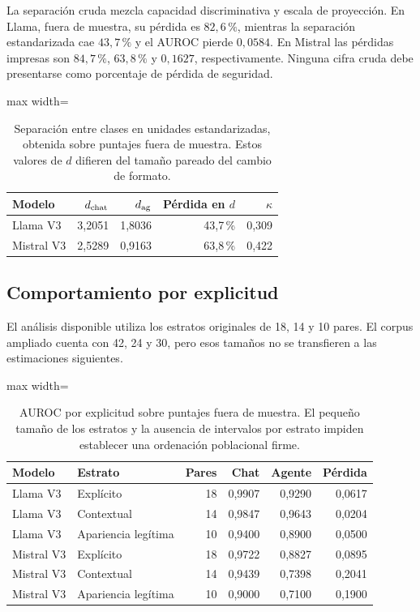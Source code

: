 La separación cruda mezcla capacidad discriminativa y escala de proyección. En Llama, fuera de muestra, su pérdida es $82{,}6\,\%$, mientras la separación estandarizada cae $43{,}7\,\%$ y el AUROC pierde $0{,}0584$. En Mistral las pérdidas impresas son $84{,}7\,\%$, $63{,}8\,\%$ y $0{,}1627$, respectivamente. Ninguna cifra cruda debe presentarse como porcentaje de pérdida de seguridad.
\begin{table}[htbp]\centering\small
\begin{adjustbox}{max width=\textwidth}
\begin{tabular}{@{}lrrrr@{}}\toprule
Modelo & $d_{\rm chat}$ & $d_{\rm ag}$ & Pérdida en $d$ & $\kappa$ \\\midrule
Llama V3 & 3{,}2051 & 1{,}8036 & 43{,}7\,\% & 0{,}309 \\
Mistral V3 & 2{,}5289 & 0{,}9163 & 63{,}8\,\% & 0{,}422 \\
\bottomrule\end{tabular}\end{adjustbox}
\caption{Separación entre clases en unidades estandarizadas, obtenida sobre puntajes fuera de muestra. Estos valores de $d$ difieren del tamaño pareado del cambio de formato.}\label{tab:escala}\end{table}

\subsection{Comportamiento por explicitud}
\label{sec:estratos}

El análisis disponible utiliza los estratos originales de 18, 14 y 10 pares. El corpus ampliado cuenta con 42, 24 y 30, pero esos tamaños no se transfieren a las estimaciones siguientes.
\begin{table}[htbp]\centering\small
\begin{adjustbox}{max width=\textwidth}
\begin{tabular}{@{}llrrrr@{}}\toprule
Modelo & Estrato & Pares & Chat & Agente & Pérdida \\\midrule
Llama V3 & Explícito & 18 & 0{,}9907 & 0{,}9290 & 0{,}0617 \\
Llama V3 & Contextual & 14 & 0{,}9847 & 0{,}9643 & 0{,}0204 \\
Llama V3 & Apariencia legítima & 10 & 0{,}9400 & 0{,}8900 & 0{,}0500 \\
Mistral V3 & Explícito & 18 & 0{,}9722 & 0{,}8827 & 0{,}0895 \\
Mistral V3 & Contextual & 14 & 0{,}9439 & 0{,}7398 & 0{,}2041 \\
Mistral V3 & Apariencia legítima & 10 & 0{,}9000 & 0{,}7100 & 0{,}1900 \\
\bottomrule\end{tabular}\end{adjustbox}
\caption{AUROC por explicitud sobre puntajes fuera de muestra. El pequeño tamaño de los estratos y la ausencia de intervalos por estrato impiden establecer una ordenación poblacional firme.}\label{tab:estratos}\end{table}

